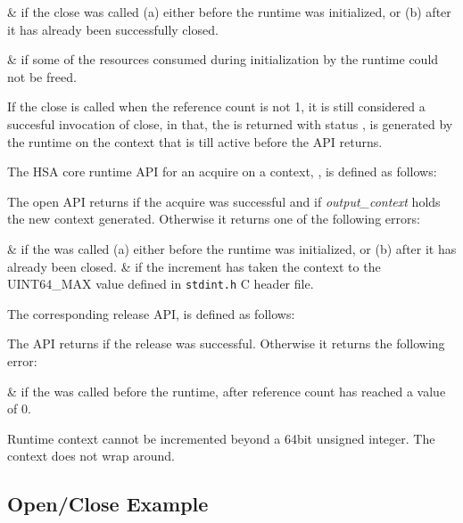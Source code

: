 \begin{easylist}
&  if the close was
called (a) either before the runtime was initialized, or (b)
after it has already been successfully closed.

&  if some of the
resources consumed during initialization by the runtime could not be
freed. 
\end{easylist}

If the close is called when the reference count is not 1, it is
still considered a succesful invocation of close, in that, the
 is returned with status
, is generated by the
runtime on the context that is till active before the API returns.

The HSA core runtime API for an acquire on a context,
, is defined as follows:



The open API returns  if the acquire was
successful and if {\itshape output\_context} holds the new context
generated. Otherwise it returns one of the following errors:

\begin{easylist}
&  if the
 was called (a) either before the
runtime was initialized, or (b) after it has already been
closed. 
&  if the increment has
taken the context to the UINT64\_MAX value defined in
\texttt{stdint.h} C header file.
\end{easylist}

The corresponding release API,  is
defined as follows:



The  API returns
 if the release was successful.
Otherwise it returns the following error:

\begin{easylist}
&  if the
 was called before the
runtime, after reference count has reached a value of 0.

Runtime context cannot be incremented beyond a 64bit unsigned
integer. The context does not wrap around.

\end{easylist}
\subsection{Open/Close Example}



